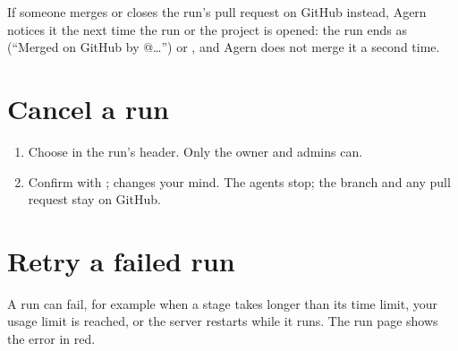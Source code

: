 If someone merges or closes the run's pull request on GitHub instead, Agern notices it the next
time the run or the project is opened: the run ends as  (``Merged on GitHub by
@\ldots'') or , and Agern does not merge it a second time.



\section{Cancel a run}\label{sec:cancel}

\begin{enumerate}
  \item Choose  in the run's header. Only the owner and admins can.
  \item Confirm with ;  changes your mind. The agents stop; the branch
    and any pull request stay on GitHub.
\end{enumerate}

\section{Retry a failed run}\label{sec:retry}

A run can fail, for example when a stage takes longer than its time limit, your usage limit is
reached, or the server restarts while it runs. The run page shows the error in red.


